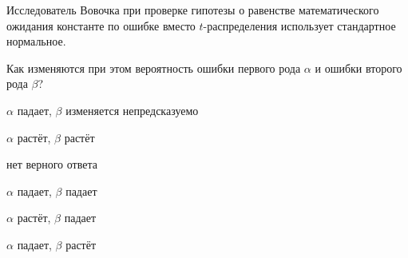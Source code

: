 
\begin{question}
Исследователь Вовочка при проверке гипотезы о равенстве математического
ожидания константе по ошибке вместо \(t\)-распределения использует
стандартное нормальное.

Как изменяются при этом вероятность ошибки первого рода \(\alpha\) и
ошибки второго рода \(\beta\)?
\begin{answerlist}
  \item \(\alpha\) падает, \(\beta\) изменяется непредсказуемо
  \item \(\alpha\) растёт, \(\beta\) растёт
  \item нет верного ответа
  \item \(\alpha\) падает, \(\beta\) падает
  \item \(\alpha\) растёт, \(\beta\) падает
  \item \(\alpha\) падает, \(\beta\) растёт
\end{answerlist}
\end{question}


